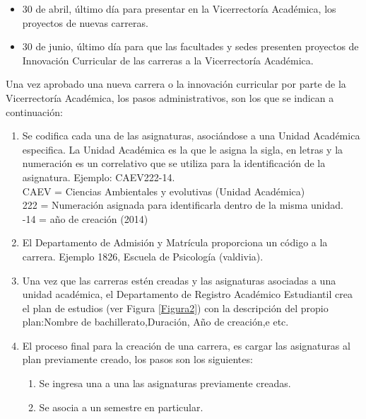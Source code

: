 		\begin{itemize}
			\item 30 de abril, último día para presentar en la Vicerrectoría Académica, los proyectos de nuevas carreras.
			\item 30 de junio, último día para que las facultades y sedes presenten proyectos de Innovación Curricular de las carreras a la Vicerrectoría Académica.
		\end{itemize}
		
		
		Una vez aprobado una nueva carrera o la innovación curricular por parte de la Vicerrectoría Académica, los pasos administrativos, son los que se indican a continuación:
		
		
		
		
		\begin{enumerate}
			
			
			\item Se codifica cada una de las asignaturas, asociándose a una Unidad Académica especifica. La Unidad Académica es la que le asigna la sigla, en letras y la numeración es un correlativo que se utiliza para la identificación de la asignatura. Ejemplo: CAEV222-14.
			\\
			CAEV = Ciencias Ambientales y evolutivas (Unidad Académica)
			\\
			222   = Numeración asignada para identificarla dentro de la misma unidad.
			\\
			-14    = año de creación (2014)
			
			\item El Departamento de Admisión y Matrícula proporciona  un código a la carrera. Ejemplo 1826, Escuela de Psicología (valdivia).
			
			\item Una vez que las carreras estén creadas y las asignaturas asociadas a una unidad académica, el Departamento de Registro Académico Estudiantil crea el plan de estudios (ver Figura \ref{Figura2}) con la descripción del propio plan:Nombre de bachillerato,Duración, Año de creación,e etc.
			
			\item El proceso final para la creación de una carrera, es cargar  las asignaturas al plan previamente creado, los pasos son los siguientes:
			\begin{enumerate}
				\item Se ingresa una a una las asignaturas previamente creadas.
				\item Se asocia a un semestre en particular.
			\end{enumerate}
		\end{enumerate}
		\newpage
		
